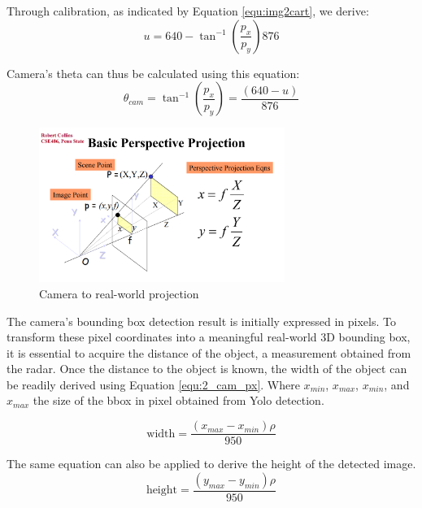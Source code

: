 Through calibration, as indicated by Equation \ref{equ:img2cart}, we derive:
\begin{equation}\label{equ:2_img2cart2}
    u=640-\tan^{-1}(\frac{p_x}{p_y})876
\end{equation}

Camera's theta can thus be calculated using this equation:
\begin{equation}\label{equ:2_cam_px}
    \theta_{cam}=
    \tan^{-1}(\frac{p_x}{p_y})=
    \frac
    {(640-u)}
    {876}
\end{equation}
\begin{figure}[hpbt]
    \centering
    \includegraphics[width=8cm]{Figures/cam_projection.png}%
    \caption{Camera to real-world projection}
    \label{fig:camera_projection}
\end{figure}

The camera's bounding box detection result is initially expressed in pixels. 
To transform these pixel coordinates into a meaningful real-world 3D bounding box, 
it is essential to acquire the distance of the object, 
a measurement obtained from the radar. 
Once the distance to the object is known, the width of the object can be readily derived using Equation \ref{equ:2_cam_px}.
Where $x_{min}$, $x_{max}$, $x_{min}$, and $x_{max}$ the size of the bbox in pixel obtained from Yolo detection. 

\begin{equation}\label{equ:2_cam_width}
    \text{width}=
    \frac
    {(x_{max}-x_{min})\rho}
    {950}
\end{equation}

The same equation can also be applied to derive the height of the detected image. 
\begin{equation}\label{equ:2_cam_height}
    \text{height}=
    \frac
    {(y_{max}-y_{min})\rho}
    {950}
\end{equation}




